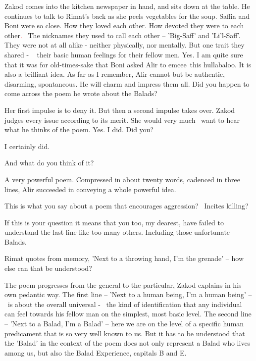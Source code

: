 \documentclass[letterpaper]{article}
\begin{document}
Zakod comes into the kitchen newspaper in hand, and sits down at the table. He continues to talk to Rimat's back as she
peels vegetables for the soup. {\textquotedbl}Saffia and Boni were so close. How they loved each other. How devoted
they were to each other\textcolor{red}{.} \ The nicknames they used to call each other -- 'Big-Saff' and 'Li'l-Saff'.
They were not at all alike - neither physically, nor mentally. But one trait they shared -
~\textcolor[rgb]{0.0,0.6901961,0.9411765}{ }their basic human feelings for their fellow men. Yes. I am quite sure that
it was for old-times-sake that Boni asked Alir to emcee~this hullabaloo. It is also a brilliant idea. As far as I
remember, Alir cannot but be authentic, disarming, spontaneous. He will charm and impress them all. Did you happen to
come across the poem he wrote about the Balads?{\textquotedbl}

Her first impulse is to deny it. But then a second impulse takes over. Zakod judges every issue according to its merit.
She would very much \ want to hear what he thinks of the poem. {\textquotedbl}Yes. I did. Did you?{\textquotedbl}

{\textquotedbl}I certainly did.{\textquotedbl}

{\textquotedbl}And what do you think of it?{\textquotedbl} 

{\textquotedbl}A very powerful poem. Compressed in about twenty words, cadenced in three lines, Alir succeeded in
conveying a whole powerful idea.{\textquotedbl}~ 

{\textquotedbl}This is what you say about a poem that encourages aggression? ~Incites killing?{\textquotedbl} 

{\textquotedbl}If this is your question it means that you too, my dearest, have failed to understand the last line like
too many others. Including those unfortunate Balads.{\textquotedbl} 

Rimat quotes from memory, 'Next to a throwing hand, I'm the grenade' -- how else can that be understood?{\textquotedbl} 

{\textquotedbl}The poem progresses from the general to the particular,{\textquotedbl} Zakod explains in his own pedantic
way. {\textquotedbl}The first line -- 'Next to a human being, I'm a human being' --~is about the overall universal -
\ the kind of identification that any individual can feel towards his fellow man on the simplest, most basic level. The
second line -- 'Next to a Balad, I'm a Balad' -- here we are on the level of a specific human predicament that is so
very well known to us. But it has to be understood that the 'Balad' in the context of the poem does not only represent
a Balad who lives among us, but also the Balad Experience, capitals B and E.{\textquotedbl}\textcolor{red}{ }
\end{document}
